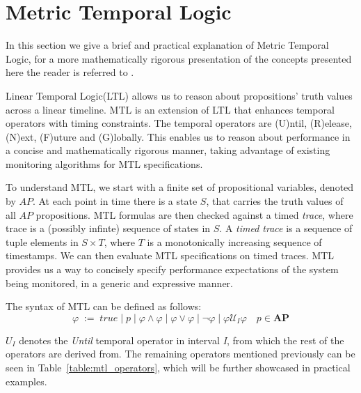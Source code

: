 \documentclass[twocolumn]{article}
\begin{document}
\section{Metric Temporal Logic}
In this section we give a brief and practical explanation of Metric Temporal Logic, for a more mathematically rigorous presentation of the concepts presented here the reader is referred to \cite{hendriks_checking_2016,dhananjayan_metric_2014,thati_monitoring_2005,pnueli_temporal_1977}.
\par
Linear Temporal Logic(LTL) \cite{pnueli_temporal_1977} allows us to reason about propositions' truth values across a linear timeline.
MTL \cite{koymans_specifying_1990} is an extension of LTL that enhances temporal operators with timing constraints. The temporal operators are (U)ntil, (R)elease, (N)ext, (F)uture and (G)lobally.
This enables us to reason about performance in a concise and mathematically rigorous manner, taking advantage of existing
monitoring algorithms for MTL specifications.

\par
To understand MTL, we start with a finite set of propositional variables, denoted by $AP$.
At each point in time there is a state $S$, that carries the truth values of all $AP$ propositions.
MTL formulas are then checked against a timed \emph{trace}, where trace is a (possibly infinte) sequence of states in $S$.
A \emph{timed trace} is a sequence of tuple elements in $S \times T$, where $T$ is a monotonically increasing sequence of timestamps.
We can then evaluate MTL specifications on timed traces.
MTL provides us a way to concisely specify performance expectations of the system being monitored, in a generic and expressive manner.

\par
The syntax of MTL can be defined as follows:
\[
	\varphi \; := \; true \; | \; p \; | \; \varphi \land \varphi \; | \; \varphi \lor \varphi \;| \; \neg \varphi \; | \; \varphi \mathcal{U}_I \varphi \quad p \in \mathbf{AP}
\]

$U_I$ denotes the \emph{Until} temporal operator in interval \emph{I}, from which the rest of the operators are derived from.
The remaining operators mentioned previously can be seen in Table~\ref{table:mtl_operators}, which will
be further showcased in practical examples.
\end{document}
